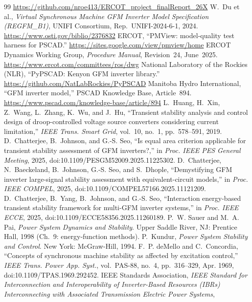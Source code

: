 \documentclass[11pt]{article}
\begin{document}
\begin{thebibliography}{99}
\url{https://github.com/nroe413/ERCOT_project_finalReport_26X}
 W.~Du et al., \emph{Virtual Synchronous Machine
GFM Inverter Model Specification (REGFM\_B1)}, UNIFI
Consortium, Rep.~UNIFI-2024-6-1, 2024.
\url{https://www.osti.gov/biblio/2376832}
 ERCOT, ``PMView: model-quality test harness for
PSCAD.'' \url{https://sites.google.com/view/pmview/home}
 ERCOT Dynamics Working Group, \emph{Procedure Manual},
Revision~24, June~2025. \url{https://www.ercot.com/committees/ros/dwg}
 National Laboratory of the Rockies (NLR),
``PyPSCAD: Kenyon GFM inverter library.''
\url{https://github.com/NatLabRockies/PyPSCAD}
 Manitoba Hydro International, ``GFM
inverter model,'' PSCAD Knowledge Base, Article~894.
\url{https://www.pscad.com/knowledge-base/article/894}
 L.~Huang, H.~Xin, Z.~Wang, L.~Zhang, K.~Wu, and
J.~Hu, ``Transient stability analysis and control design of
droop-controlled voltage source converters considering current
limitation,'' \emph{IEEE Trans. Smart Grid}, vol.~10, no.~1,
pp.~578--591, 2019.
 D.~Chatterjee, B.~Johnson, and G.-S. Seo,
``Is equal area criterion applicable for transient stability assessment
of GFM inverters?,'' in \emph{Proc. IEEE PES General Meeting},
2025, doi:10.1109/PESGM52009.2025.11225302.
 D.~Chatterjee, N.~Baeckeland,
B.~Johnson, G.-S. Seo, and S.~Dhople, ``Demystifying GFM
inverter large-signal stability assessment with equivalent-circuit
models,'' in \emph{Proc. IEEE COMPEL}, 2025,
doi:10.1109/COMPEL57166.2025.11121209.
 D.~Chatterjee, B.~Yang, B.~Johnson, and
G.-S. Seo, ``Interaction energy-based transient stability framework for
multi-GFM inverter systems,'' in \emph{Proc. IEEE ECCE}, 2025,
doi:10.1109/ECCE58356.2025.11260189.
 P.~W. Sauer and M.~A. Pai, \emph{Power System
Dynamics and Stability}. Upper Saddle River, NJ: Prentice Hall, 1998
(Ch.~9: energy-function methods).
 P.~Kundur, \emph{Power System Stability and
Control}. New York: McGraw-Hill, 1994.
 F.~P. deMello and C.~Concordia, ``Concepts of synchronous machine stability as affected by excitation control,'' \emph{IEEE Trans. Power App. Syst.}, vol.~PAS-88, no.~4, pp.~316--329, Apr. 1969, doi:10.1109/TPAS.1969.292452.
 IEEE Standards Association, \emph{IEEE Standard for
Interconnection and Interoperability of Inverter-Based Resources (IBRs)
Interconnecting with Associated Transmission Electric Power Systems},

\end{thebibliography}
\end{document}
